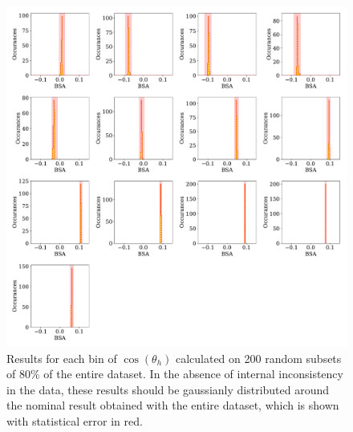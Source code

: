\begin{figure}
  \begin{center}
    \includegraphics[width=\columnwidth]{image/subsets.pdf}
    \caption{Results for each bin of $\cos(\theta_h)$ calculated on 200 random subsets of 80\% of the entire dataset.  In the absence of internal inconsistency in the data, these results should be gaussianly distributed around the nominal result obtained with the entire dataset, which is shown with statistical error in red.}
  \end{center}
\end{figure}

